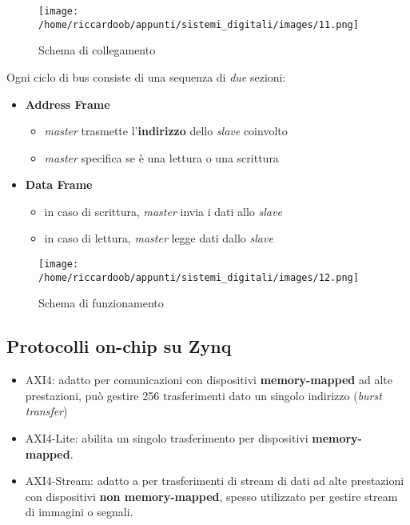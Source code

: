 \begin{figure}[H]
    \caption{Schema di collegamento}
    \centering
    \texttt{[image: /home/riccardoob/appunti/sistemi\_digitali/images/11.png]}
\end{figure}

Ogni ciclo di bus consiste di una sequenza di \textit{due} sezioni:
\begin{itemize}
    \item \textbf{Address Frame}
    \begin{itemize}
        \item \textit{master} trasmette l'\textbf{indirizzo} dello \textit{slave} coinvolto
        \item \textit{master} specifica se è una lettura o una scrittura
    \end{itemize}
    \item \textbf{Data Frame}
    \begin{itemize}
        \item in caso di scrittura, \textit{master} invia i dati allo \textit{slave}
        \item in caso di lettura, \textit{master} legge dati dallo \textit{slave}
    \end{itemize}
\end{itemize}

\begin{figure}[H]
    \caption{Schema di funzionamento}
    \centering
    \texttt{[image: /home/riccardoob/appunti/sistemi\_digitali/images/12.png]}
\end{figure}

\subsection{Protocolli on-chip su Zynq}
\begin{itemize}
    \item AXI4: adatto per comunicazioni con dispositivi \textbf{memory-mapped} ad alte prestazioni, può gestire 256 trasferimenti dato un singolo indirizzo (\textit{burst transfer})
    \item AXI4-Lite: abilita un singolo trasferimento per dispositivi \textbf{memory-mapped}.
    \item AXI4-Stream: adatto a per trasferimenti di stream di dati ad alte prestazioni con dispositivi \textbf{non memory-mapped}, spesso utilizzato per gestire stream di immagini o segnali.
\end{itemize}

